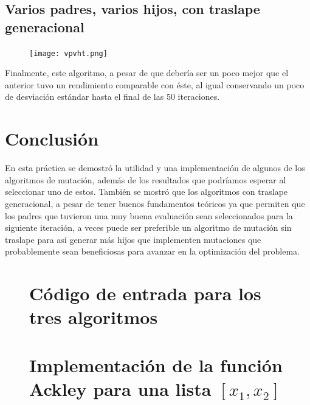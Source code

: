 \documentclass[sigconf,authorversion,nonacm]{acmart}
\begin{document}
\pagebreak

\subsection{Varios padres, varios hijos, con traslape generacional}
\begin{figure}[H]
  \centering
  \texttt{[image: vpvht.png]}
\end{figure}

Finalmente, este algoritmo, a pesar de que debería ser un poco mejor que el anterior tuvo un rendimiento comparable con éste, al igual conservando un poco de desviación estándar hasta el final de las 50 iteraciones.


\section{Conclusión}
En esta práctica se demostró la utilidad y una implementación de algunos de los algoritmos de mutación, además de los resultados que podríamos esperar al seleccionar uno de estos. También se mostró que los algoritmos con traslape generacional, a pesar de tener buenos fundamentos teóricos ya que permiten que los padres que tuvieron una muy buena evaluación sean seleccionados para la siguiente iteración, a veces puede ser preferible un algoritmo de mutación sin traslape para así generar más hijos que implementen mutaciones que probablemente sean beneficiosas para avanzar en la optimización del problema.


\clearpage

\appendix

\lstset{
  frame=single,
  basicstyle=\footnotesize,
  numbers=left,
  numbersep=5pt,
  showstringspaces=false
}

\begin{figure}
  \section{Código de entrada para los tres algoritmos}
  
\end{figure}

\begin{figure}
  \section{Implementación de la función Ackley para una lista $[x_1, x_2]$}
  
\end{figure}
\end{document}
